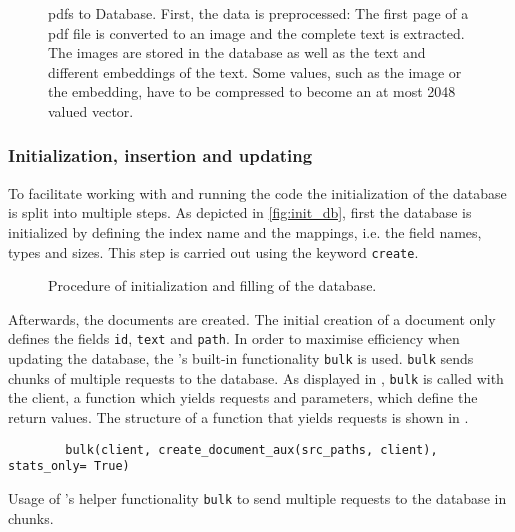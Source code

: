 \begin{figure}[htp] %
    \centering
    
    \caption{\acp{pdf} to Database. 
    First, the data is preprocessed:
    The first page of a \ac{pdf} file is converted to an image and the complete text is extracted. 
    The images are stored in the database as well as the text and different embeddings of the text.
    Some values, such as the image or the \infersent{} embedding, have to be compressed to become an at most 2048 valued vector.
    }
    \label{fig:pdf2db}
\end{figure}

\subsubsection*{Initialization, insertion and updating}
To facilitate working with and running the code the initialization of the database is split into multiple steps.
As depicted in \autoref{fig:init_db}, first the database is initialized by defining the index name and the mappings, i.e. the field names, types and sizes.
This step is carried out using the keyword \texttt{create}.

\begin{figure}[htp] %
    \centering
    
    \caption{Procedure of initialization and filling of the database.}
    \label{fig:init_db}
\end{figure}

Afterwards, the documents are created.
The initial creation of a document only defines the fields \texttt{id}, \texttt{text} and \texttt{path}.
In order to maximise efficiency when updating the database, the \databaseName{}'s built-in functionality \texttt{bulk} is used.
\texttt{bulk} sends chunks of multiple requests to the database.
As displayed in , \texttt{bulk} is called with the \databaseName{} client, 
a function which yields requests and parameters, which define the return values.
The structure of a function that yields requests is shown in .

\begin{listing}[htp]
    \begin{verbatim}
        bulk(client, create_document_aux(src_paths, client), stats_only= True)
    \end{verbatim}
    \caption{Usage of \databaseName{}'s helper functionality \texttt{bulk} to send multiple requests to the database in chunks.
    }
    \label{lst:db_bulk}
\end{listing}

